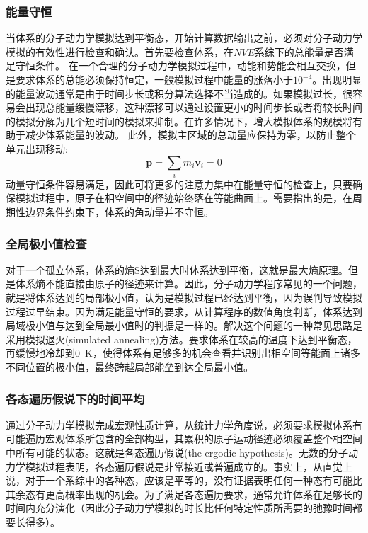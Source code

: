 \subsubsection{能量守恒}
当体系的分子动力学模拟达到平衡态，开始计算数据输出之前，必须对分子动力学模拟的有效性进行检查和确认。首先要检查体系，在$NVE$系综下的总能量是否满足守恒条件。
在一个合理的分子动力学模拟过程中，动能和势能会相互交换，但是要求体系的总能必须保持恒定，一般模拟过程中能量的涨落小于$10^{−4}$。出现明显的能量波动通常是由于时间步长或积分算法选择不当造成的。如果模拟过长，很容易会出现总能量缓慢漂移，这种漂移可以通过设置更小的时间步长或者将较长时间的模拟分解为几个短时间的模拟来抑制。在许多情况下，增大模拟体系的规模将有助于减少体系能量的波动。
此外，模拟主区域的总动量应保持为零，以防止整个单元出现移动:
\begin{equation}
	\mathbf{p}=\sum_im_i\mathbf{v}_i=0
	\label{eq:momentum_conserved}
\end{equation}
动量守恒条件容易满足，因此可将更多的注意力集中在能量守恒的检查上，只要确保模拟过程中，原子在相空间中的径迹始终落在等能曲面上。需要指出的是，在周期性边界条件约束下，体系的角动量并不守恒。
\subsubsection{全局极小值检查}
对于一个孤立体系，体系的熵S达到最大时体系达到平衡，这就是最大熵原理。但是体系熵不能直接由原子的径迹来计算。因此，分子动力学程序常见的一个问题，就是将体系达到的局部极小值，认为是模拟过程已经达到平衡，因为误判导致模拟过程过早结束。因为满足能量守恒的要求，从计算程序的数值角度判断，体系达到局域极小值与达到全局最小值时的判据是一样的。解决这个问题的一种常见思路是采用模拟退火\textrm{(simulated annealing)}方法。要求体系在较高的温度下达到平衡态，再缓慢地冷却到0~\textrm{K}，使得体系有足够多的机会查看并识别出相空间等能面上诸多不同位置的极小值，最终跨越局部能垒到达全局最小值。
\subsubsection{各态遍历假说下的时间平均}
通过分子动力学模拟完成宏观性质计算，从统计力学角度说，必须要求模拟体系有可能遍历宏观体系所包含的全部构型，其累积的原子运动径迹必须覆盖整个相空间中所有可能的状态。这就是各态遍历假说\textrm{(the ergodic hypothesis)}。无数的分子动力学模拟过程表明，各态遍历假说是非常接近或普遍成立的。事实上，从直觉上说，对于一个系综中的各种态，应该是平等的，没有证据表明任何一种态有可能比其余态有更高概率出现的机会。为了满足各态遍历要求，通常允许体系在足够长的时间内充分演化（因此分子动力学模拟的时长比任何特定性质所需要的弛豫时间都要长得多）。

